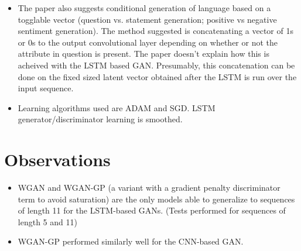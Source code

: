 \documentclass[12pt]{scrartcl}
\begin{document}
\begin{itemize}
    \item The paper also suggests conditional generation of language based on a togglable vector (question vs. statement generation; positive vs negative sentiment generation). The method suggested is concatenating a vector of 1s or 0s to the output convolutional layer depending on whether or not the attribute in question is present. The paper doesn't explain how this is acheived with the LSTM based GAN. Presumably, this concatenation can be done on the fixed sized latent vector obtained after the LSTM is run over the input sequence.
    \item Learning algorithms used are ADAM and SGD. LSTM generator/discriminator learning is smoothed.
  \end{itemize}

\section{Observations}
  \begin{itemize}
    \item WGAN and WGAN-GP (a variant with a gradient penalty discriminator term to avoid saturation) are the only models able to generalize to sequences of length 11 for the LSTM-based GANs. (Tests performed for sequences of length 5 and 11)
    \item WGAN-GP performed similarly well for the CNN-based GAN.
  \end{itemize}



\end{document}
